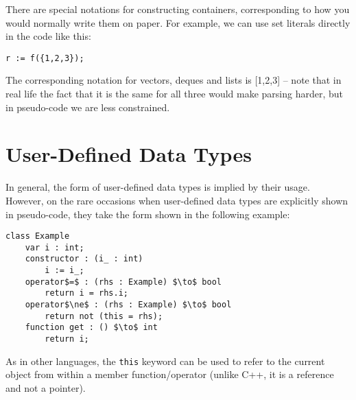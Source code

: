 There are special notations for constructing containers, corresponding to how you would normally write them on paper. For example, we can use set literals directly in the code like this:
%
\begin{lstlisting}[style=Snippet]
r := f({1,2,3});
\end{lstlisting}
%
The corresponding notation for vectors, deques and lists is [1,2,3] -- note that in real life the fact that it is the same for all three would make parsing harder, but in pseudo-code we are less constrained.

\section{User-Defined Data Types}

In general, the form of user-defined data types is implied by their usage. However, on the rare occasions when user-defined data types are explicitly shown in pseudo-code, they take the form shown in the following example:
%
\begin{lstlisting}[style=Snippet]
class Example
	var i : int;
	constructor : (i_ : int)
		i := i_;
	operator$=$ : (rhs : Example) $\to$ bool
		return i = rhs.i;
	operator$\ne$ : (rhs : Example) $\to$ bool
		return not (this = rhs);
	function get : () $\to$ int
		return i;
\end{lstlisting}
%
As in other languages, the \texttt{this} keyword can be used to refer to the current object from within a member function/operator (unlike C++, it is a reference and not a pointer).
